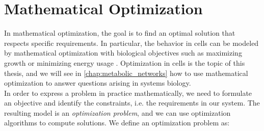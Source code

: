 \thispagestyle{plain}
\chapter{Mathematical Optimization} \label{chap:optimization}
In mathematical optimization, the goal is to find an optimal solution that respects specific requirements. In particular, the behavior in cells can be modeled by mathematical optimization with biological objectives such as maximizing growth or minimizing energy usage \cite{intro_computational_systems_biology}. Optimization in cells is the topic of this thesis, and we will see in \cref{chap:metabolic_networks} how to use mathematical optimization to answer questions arising in systems biology. \\ 
In order to express a problem in practice mathematically, we need to formulate an objective and identify the constraints, i.e. the requirements in our system.
The resulting model is an \textit{optimization problem}, and we can use optimization algorithms to compute solutions. 
We define an optimization problem as:

